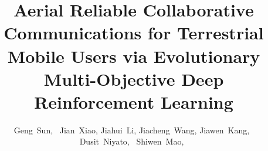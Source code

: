 \documentclass[10pt,journal,compsoc]{IEEEtran}
\begin{document}
\title{Aerial Reliable Collaborative Communications for Terrestrial Mobile Users via Evolutionary Multi-Objective Deep Reinforcement Learning}

\author{Geng~Sun,~
Jian~Xiao,
Jiahui~Li,
Jiacheng~Wang,
Jiawen~Kang,~
Dusit~Niyato,~
Shiwen~Mao,~
  
}
\end{document}
